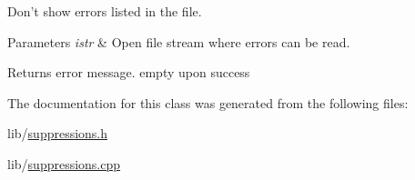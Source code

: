 Don't show errors listed in the file. 


\begin{DoxyParams}{Parameters}
{\em istr} & Open file stream where errors can be read. \\
\hline
\end{DoxyParams}
\begin{DoxyReturn}{Returns}
error message. empty upon success 
\end{DoxyReturn}


The documentation for this class was generated from the following files\-:\begin{DoxyCompactItemize}
\item 
lib/\hyperlink{suppressions_8h}{suppressions.\-h}\item 
lib/\hyperlink{suppressions_8cpp}{suppressions.\-cpp}\end{DoxyCompactItemize}
